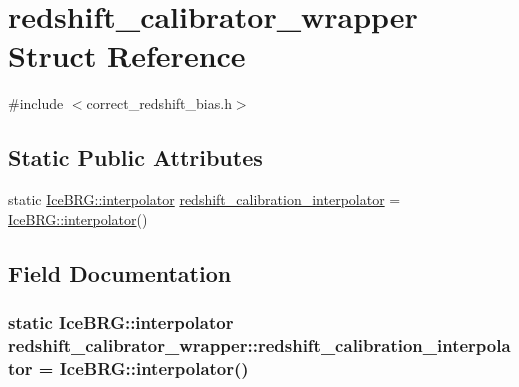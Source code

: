 \hypertarget{structredshift__calibrator__wrapper}{\section{redshift\-\_\-calibrator\-\_\-wrapper Struct Reference}
\label{structredshift__calibrator__wrapper}
}


{\ttfamily \#include $<$correct\-\_\-redshift\-\_\-bias.\-h$>$}

\subsection*{Static Public Attributes}
\begin{DoxyCompactItemize}
\item 
static \hyperlink{classIceBRG_1_1interpolator}{Ice\-B\-R\-G\-::interpolator} \hyperlink{structredshift__calibrator__wrapper_a4e6bea17881f1f93ef19b5901bb6c5f3}{redshift\-\_\-calibration\-\_\-interpolator} = \hyperlink{classIceBRG_1_1interpolator}{Ice\-B\-R\-G\-::interpolator}()
\end{DoxyCompactItemize}


\subsection{Field Documentation}
\hypertarget{structredshift__calibrator__wrapper_a4e6bea17881f1f93ef19b5901bb6c5f3}{
\subsubsection[{redshift\-\_\-calibration\-\_\-interpolator}]{\setlength{\rightskip}{0pt plus 5cm}static {\bf Ice\-B\-R\-G\-::interpolator} redshift\-\_\-calibrator\-\_\-wrapper\-::redshift\-\_\-calibration\-\_\-interpolator = {\bf Ice\-B\-R\-G\-::interpolator}()\hspace{0.3cm}{\ttfamily [static]}}}\label{structredshift__calibrator__wrapper_a4e6bea17881f1f93ef19b5901bb6c5f3}


